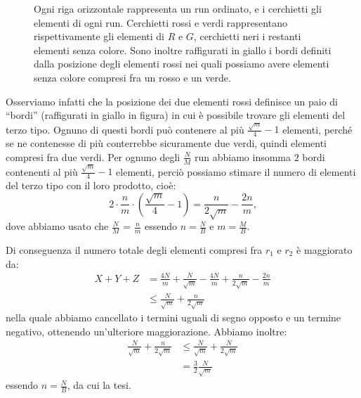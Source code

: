 \begin{proof*}
\begin{figure}
        \caption{Ogni riga orizzontale rappresenta un run ordinato, e i 
        cerchietti gli elementi di ogni run. Cerchietti rossi e verdi 
        rappresentano rispettivamente gli elementi di \(R\) e \(G\), 
        cerchietti neri i restanti elementi senza colore. Sono inoltre 
        raffigurati in giallo i bordi definiti dalla posizione degli 
        elementi rossi nei quali possiamo avere elementi senza colore 
        compresi fra un rosso e un verde.}
    \end{figure}
    Osserviamo infatti che la posizione dei due elementi rossi definisce
    un paio di ``bordi'' (raffigurati in giallo in figura) in cui \`e
    possibile trovare gli elementi del terzo tipo. Ognuno di questi 
    bordi può contenere al pi\`u \(\frac{\sqrt{m}}{4}-1\) elementi,
    perché se ne contenesse di pi\`u conterrebbe sicuramente due verdi,
    quindi elementi compresi fra due verdi. Per ognuno degli 
    \(\frac{N}{M}\) run abbiamo insomma \(2\) bordi contenenti al pi\`u 
    \(\frac{\sqrt{m}}{4}-1\) elementi, perci\`o possiamo stimare il
    numero di elementi del terzo tipo con il loro prodotto, cio\`e:
    \[
        2 \cdot \frac{n}{m} \cdot \left( \frac{\sqrt{m}}{4}-1 \right) = \frac{n}{2\sqrt{m}} - \frac{2n}{m}\mbox{,}
    \]
    dove abbiamo usato che \(\frac{N}{M}\) = \(\frac{n}{m}\) essendo
    \(n = \frac{N}{B}\) e \(m = \frac{M}{B}\).
        
    Di conseguenza il numero totale degli elementi compresi fra \(r_1\) 
    e \(r_2\) è maggiorato da:
    \begin{align}
        X + Y + Z &= \frac{4N}{m} + \frac{N}{\sqrt{m}} - \frac{4N}{m} + \frac{n}{2\sqrt{m}} - \frac{2n}{m} \nonumber \\
        &\le \frac{N}{\sqrt{m}} + \frac{n}{2\sqrt{m}} \nonumber
    \end{align}
    nella quale abbiamo cancellato i termini uguali di segno opposto e un
    termine negativo, ottenendo un'ulteriore maggiorazione. Abbiamo
    inoltre:
    \begin{align}
        \frac{N}{\sqrt{m}} + \frac{n}{2\sqrt{m}} &\le \frac{N}{\sqrt{m}} + \frac{N}{2\sqrt{m}} \nonumber \\
        &= \frac{3}{2}\frac{N}{\sqrt{m}} \nonumber
    \end{align}
    essendo \(n = \frac{N}{B}\), da cui la tesi.
\end{proof*}